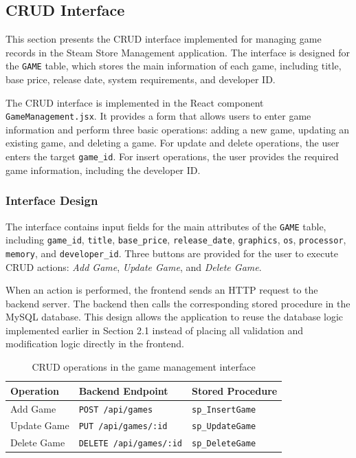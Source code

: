 \subsection{CRUD Interface}

This section presents the CRUD interface implemented for managing game records in the Steam Store Management application. 
The interface is designed for the \texttt{GAME} table, which stores the main information of each game, including title, base price, release date, system requirements, and developer ID.

The CRUD interface is implemented in the React component \texttt{GameManagement.jsx}. 
It provides a form that allows users to enter game information and perform three basic operations: adding a new game, updating an existing game, and deleting a game. 
For update and delete operations, the user enters the target \texttt{game\_id}. 
For insert operations, the user provides the required game information, including the developer ID.
\subsubsection{Interface Design}

The interface contains input fields for the main attributes of the \texttt{GAME} table, including \texttt{game\_id}, \texttt{title}, \texttt{base\_price}, \texttt{release\_date}, \texttt{graphics}, \texttt{os}, \texttt{processor}, \texttt{memory}, and \texttt{developer\_id}. 
Three buttons are provided for the user to execute CRUD actions: \textit{Add Game}, \textit{Update Game}, and \textit{Delete Game}.

When an action is performed, the frontend sends an HTTP request to the backend server. 
The backend then calls the corresponding stored procedure in the MySQL database. 
This design allows the application to reuse the database logic implemented earlier in Section 2.1 instead of placing all validation and modification logic directly in the frontend.
\begin{table}[H]
\centering
\caption{CRUD operations in the game management interface}
\label{tab:crud-interface-operations}
\begin{tabular}{|l|l|l|}
\hline
\textbf{Operation} & \textbf{Backend Endpoint} & \textbf{Stored Procedure} \\ \hline
Add Game & \texttt{POST /api/games} & \texttt{sp\_InsertGame} \\ \hline
Update Game & \texttt{PUT /api/games/:id} & \texttt{sp\_UpdateGame} \\ \hline
Delete Game & \texttt{DELETE /api/games/:id} & \texttt{sp\_DeleteGame} \\ \hline
\end{tabular}
\end{table}
